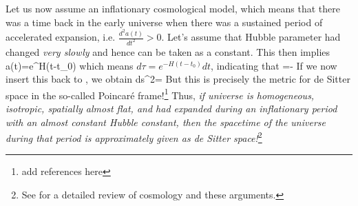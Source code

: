 \documentclass[12pt]{article}
\newcommand\draftnote[1]{{\color{blue} #1}}
\numberwithin{equation}{section}
\begin{document}
Let us now assume an inflationary cosmological model, which means that there was a time back in the early universe when there was a sustained period of accelerated expansion, i.e. \mbox{$\frac{d^2a(t)}{dt^2}>0$}. Let's assume that Hubble parameter had changed \emph{very slowly} and hence can be taken as a constant. This then implies
\be 
a(t)=e^{H(t-t_0)}
\ee 
which means $d\tau=e^{-H(t-t_0)}dt$, indicating that
\be 
\tau=-
\ee 
If we now insert this back to , we obtain
\be
\label{eq: dS metric}
ds^2=
 \ee 
But this is precisely the metric for de Sitter space in the so-called Poincar\'e frame!\footnote{\draftnote{add references here}} Thus, \emph{if universe is homogeneous, isotropic, spatially almost flat, and had expanded during an inflationary period with an almost constant Hubble constant, then the spacetime of the universe during that period is approximately given as de Sitter space!}\footnote{See \cite{Baumann:2018muz} for a detailed review of cosmology and these arguments.}
\end{document}
